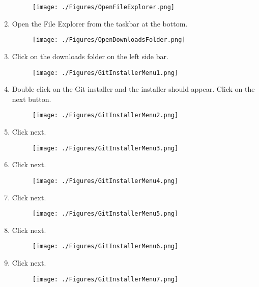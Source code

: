 \documentclass[12pt]{article}
\begin{document}
\begin{center}
	\begin{enumerate}
		\begin{figure}[H]
			\texttt{[image: ./Figures/OpenFileExplorer.png]}
		\end{figure}
		\item Open the File Explorer from the taskbar at the bottom.
		      \begin{figure}[H]
			      \texttt{[image: ./Figures/OpenDownloadsFolder.png]}
		      \end{figure}
		\item Click on the downloads folder on the left side bar.
		      \begin{figure}[H]
			      \texttt{[image: ./Figures/GitInstallerMenu1.png]}
		      \end{figure}
		\item Double click on the Git installer and the installer should appear. Click on the next button.
		      \begin{figure}[H]
			      \texttt{[image: ./Figures/GitInstallerMenu2.png]}
		      \end{figure}
		\item Click next.
		      \begin{figure}[H]
			      \texttt{[image: ./Figures/GitInstallerMenu3.png]}
		      \end{figure}
		\item Click next.
		      \begin{figure}[H]
			      \texttt{[image: ./Figures/GitInstallerMenu4.png]}
		      \end{figure}
		\item Click next.
		      \begin{figure}[H]
			      \texttt{[image: ./Figures/GitInstallerMenu5.png]}
		      \end{figure}
		\item Click next.
		      \begin{figure}[H]
			      \texttt{[image: ./Figures/GitInstallerMenu6.png]}
		      \end{figure}
		\item Click next.
		      \begin{figure}[H]
			      \texttt{[image: ./Figures/GitInstallerMenu7.png]}
		      \end{figure}

\end{enumerate}
\end{center}
\end{document}
